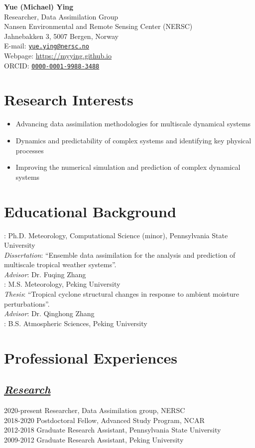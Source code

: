 \documentclass{article}
\newcommand{\cvsection}[1]{\section*{\bfseries#1}}
\newcommand{\cvsubsection}[1]{\subsection*{\itshape\uline{#1}}}
\begin{document}
\begin{center}
\huge{\textbf{Yue (Michael) Ying}} \\
\vspace{10pt}
\normalsize{Researcher, Data Assimilation Group \\
Nansen Environmental and Remote Sensing Center (NERSC) \\
Jahnebakken 3, 5007 Bergen, Norway \\
E-mail: \href{mailto:yue.ying@nersc.no}{\texttt{yue.ying@nersc.no}} \\
Webpage: \url{https://myying.github.io} \\
ORCID: \href{https://orcid.org/0000-0001-9988-3488}{\texttt{0000-0001-9988-3488}} }
\end{center}


\cvsection{Research Interests}
\begin{itemize}[leftmargin=2em, topsep=0pt, itemsep=0pt]
    \item Advancing data assimilation methodologies for multiscale dynamical systems
    \item Dynamics and predictability of complex systems and identifying key physical processes
    \item Improving the numerical simulation and prediction of complex dynamical systems
\end{itemize}


\cvsection{Educational Background}
: Ph.D. Meteorology, Computational Science (minor), Pennsylvania State University \\
\indent \textit{Dissertation}: ``Ensemble data assimilation for the analysis and prediction of multiscale tropical weather systems''. \\
\indent \textit{Advisor}: Dr. Fuqing Zhang \\

: M.S. Meteorology, Peking University \\
\indent \textit{Thesis}: ``Tropical cyclone structural changes in response to ambient moisture perturbations''. \\
\indent \textit{Advisor}: Dr. Qinghong Zhang \\

: B.S. Atmospheric Sciences, Peking University \\

\cvsection{Professional Experiences}
\cvsubsection{Research}
2020-present \hfill Researcher, Data Assimilation group, NERSC \\
2018-2020 Postdoctoral Fellow, Advanced Study Program, NCAR \\
2012-2018 Graduate Research Assistant, Pennsylvania State University \\
2009-2012 Graduate Research Assistant, Peking University \\
\end{document}
